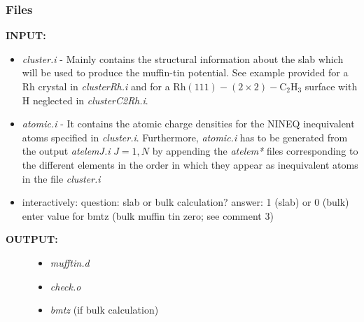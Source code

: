 \documentclass[letterpaper,10pt,english]{sphinxmanual}
\begin{document}
\subsubsection{Files}
\label{phshift2007:id2}
\textbf{INPUT:}
\begin{itemize}
\item {} 
\emph{cluster.i} - Mainly contains the structural information
about the slab which will be used to produce
the muffin-tin potential. See example
provided for a Rh crystal in \emph{clusterRh.i}
and for a \(\text{Rh} (111)-(2 \times 2)- \text{C} _2 \text{H} _3\)
surface with H neglected in \emph{clusterC2Rh.i}.

\item {} 
\emph{atomic.i}  - It contains the atomic charge densities for
the NINEQ inequivalent atoms specified in
\emph{cluster.i}. Furthermore,
\emph{atomic.i} has to be generated from the output
\emph{atelemJ.i}  \(J = 1, N\) by appending the \emph{atelem*}
files corresponding to the different elements
in the order in which they appear as
inequivalent atoms in the file \emph{cluster.i}

\item {} 
interactively:  question: slab or bulk calculation?
answer: 1 (slab) or 0 (bulk)
enter value for bmtz (bulk muffin tin
zero; see comment 3)

\end{itemize}
\begin{description}
\item[{\textbf{OUTPUT:}}] \leavevmode\begin{itemize}
\item {} 
\emph{mufftin.d}

\item {} 
\emph{check.o}

\item {} 
\emph{bmtz} (if bulk calculation)

\end{itemize}

\end{description}
\end{document}
